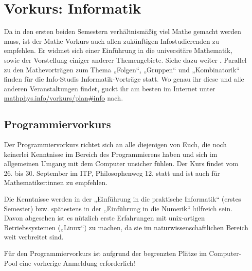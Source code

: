 \section{Vorkurs: Informatik}
\label{vkinfo}
Da in den ersten beiden Semestern verhältnismäßig viel Mathe gemacht werden muss, ist der Mathe-Vorkurs auch allen zukünftigen Infostudierenden zu empfehlen. Er widmet sich einer Einführung in die universitäre Mathematik, sowie der Vorstellung einiger anderer Themengebiete. Siehe dazu weiter
.
Parallel zu den Mathevorträgen zum Thema „Folgen“, „Gruppen“ und „Kombinatorik“ finden für die Info-Studis Informatik-Vorträge statt.
Wo genau ihr diese und alle anderen Veranstaltungen findet, guckt ihr am besten im Internet unter \url{mathphys.info/vorkurs/plan\#info}  nach.


\parskip

\subsection{Programmiervorkurs}
Der Programmiervorkurs richtet sich an alle diejenigen von Euch, die noch keinerlei Kenntnisse im Bereich des Programmierens haben und sich im allgemeinen Umgang mit dem Computer unsicher fühlen. Der Kurs findet vom 26. bis 30. September im \gls{ITP}, Philosophenweg 12, statt und ist auch für Mathematiker:innen zu empfehlen.

Die Kenntnisse werden in der „Einführung in die praktische Informatik“ (erstes Semester) bzw. spätestens in der „Einführung in die Numerik“ hilfreich sein. Davon abgesehen ist es nützlich erste Erfahrungen mit unix-artigen Betriebssystemen („Linux“) zu machen, da sie im naturwissenschaftlichen Bereich weit verbreitet sind.

Für den Programmiervorkurs ist aufgrund der begrenzten Plätze im Computer-Pool eine vorherige Anmeldung erforderlich!
